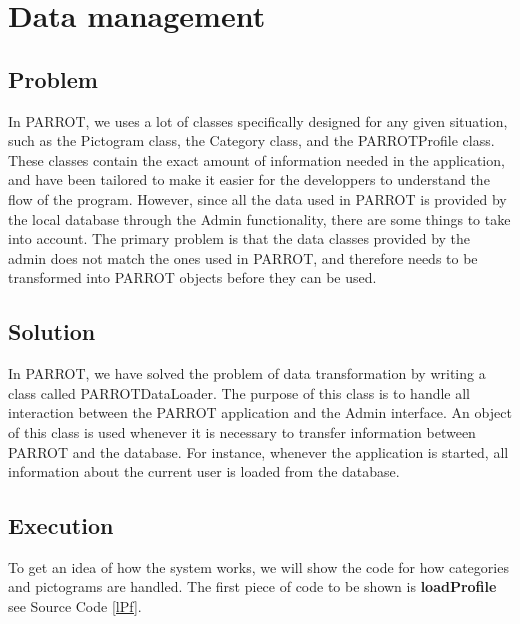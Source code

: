 \section{Data management}
\subsection*{Problem}
In PARROT, we uses a lot of classes specifically designed for any given situation, such as the Pictogram class, the Category class, and the PARROTProfile class.
These classes contain the exact amount of information needed in the application, and have been tailored to make it easier for the developpers to understand the flow of the program.\newline
However, since all the data used in PARROT is provided by the local database through the Admin functionality, there are some things to take into account.
The primary problem is that the data classes provided by the admin does not match the ones used in PARROT, and therefore needs to be transformed into PARROT objects before they can be used.

\subsection*{Solution}
In PARROT, we have solved the problem of data transformation by writing a class called PARROTDataLoader. The purpose of this class is to handle all interaction between the PARROT application and the Admin interface. An object of this class is used whenever it is necessary to transfer information between PARROT and the database. For instance, whenever the application is started, all information about the current user is loaded from the database.

\subsection*{Execution}
To get an idea of how the system works, we will show the code for how categories and pictograms are handled.\newline
The first piece of code to be shown is \textbf{loadProfile} see Source Code \ref{lPf}.

